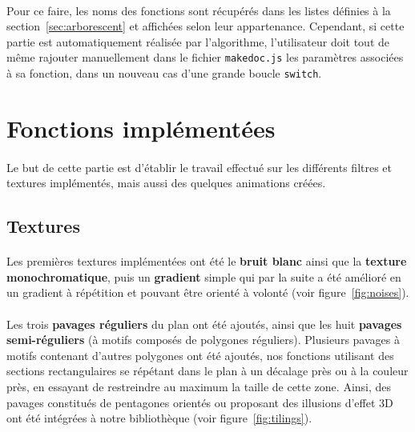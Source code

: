 \documentclass[a4paper]{article}
\begin{document}
\paragraph{}
Pour ce faire, les noms des fonctions sont récupérés dans les listes définies à la section~\ref{sec:arborescent} et affichées selon leur appartenance. Cependant, si cette partie est automatiquement réalisée par l'algorithme, l'utilisateur doit tout de même rajouter manuellement dans le fichier \texttt{makedoc.js} les paramètres associées à sa fonction, dans un nouveau cas d'une grande boucle \texttt{switch}.



\section{Fonctions implémentées}
\paragraph{}
Le but de cette partie est d'établir le travail effectué sur les différents filtres et textures implémentés, mais aussi des quelques animations créées.

\subsection{Textures}
\label{sec:textures}

\paragraph{}
Les premières textures implémentées ont été le \textbf{bruit blanc} ainsi que la \textbf{texture monochromatique}, puis un \textbf{gradient} simple qui par la suite a été amélioré en un gradient à répétition et pouvant être orienté à volonté (voir figure~\ref{fig:noises}).

\paragraph{}
Les trois \textbf{pavages réguliers} du plan ont été ajoutés, ainsi que les huit \textbf{pavages semi-réguliers}\cite{regularTiling} (à motifs composés de polygones réguliers). Plusieurs pavages à motifs contenant d'autres polygones ont été ajoutés, nos fonctions utilisant des sections rectangulaires se répétant dans le plan à un décalage près ou à la couleur près, en essayant de restreindre au maximum la taille de cette zone. Ainsi, des pavages constitués de pentagones orientés ou proposant des illusions d'effet 3D ont été intégrées à notre bibliothèque (voir figure~\ref{fig:tilings}).
\end{document}
